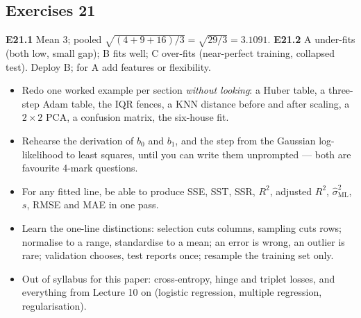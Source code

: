 \documentclass[11pt]{article}
\newcommand{\ans}[1]{\subsection*{#1}}
\begin{document}
\ans{Exercises 21}
\textbf{E21.1} Mean $3$; pooled $\sqrt{(4 + 9 + 16)/3} = \sqrt{29/3} = 3.1091$.
\textbf{E21.2} A under-fits (both low, small gap); B fits well; C over-fits
(near-perfect training, collapsed test). Deploy B; for A add features or
flexibility.

\vspace{1em}
\begin{keyidea}
\begin{itemize}
  \item Redo one worked example per section \emph{without looking}: a Huber
    table, a three-step Adam table, the IQR fences, a KNN distance before and
    after scaling, a $2\times2$ PCA, a confusion matrix, the six-house fit.
  \item Rehearse the derivation of $b_0$ and $b_1$, and the step from the
    Gaussian log-likelihood to least squares, until you can write them
    unprompted --- both are favourite 4-mark questions.
  \item For any fitted line, be able to produce SSE, SST, SSR, $R^2$,
    adjusted $R^2$, $\hat\sigma^2_{\text{ML}}$, $s$, RMSE and MAE in one pass.
  \item Learn the one-line distinctions: selection cuts columns, sampling cuts
    rows; normalise to a range, standardise to a mean; an error is wrong, an
    outlier is rare; validation chooses, test reports once; resample the
    training set only.
  \item Out of syllabus for this paper: cross-entropy, hinge and triplet
    losses, and everything from Lecture 10 on (logistic regression, multiple
    regression, regularisation).
\end{itemize}
\end{keyidea}
\end{document}
